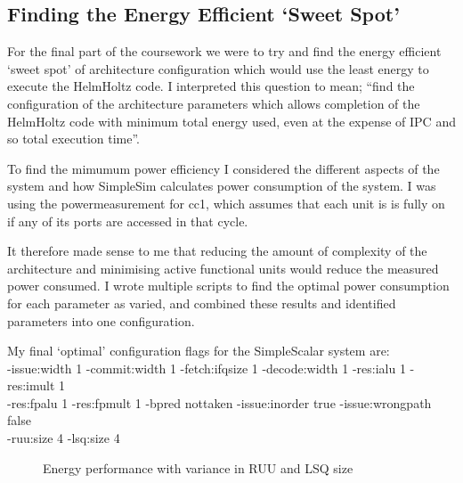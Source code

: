\documentclass[paper=a4, fontsize=11pt]{scrartcl} %
\numberwithin{equation}{section} %
\numberwithin{figure}{section} %
\numberwithin{table}{section} %
\begin{document}
\subsection{Finding the Energy Efficient `Sweet Spot'}

For the final part of the coursework we were to try and find the energy efficient `sweet spot' of architecture configuration which would use the least energy to execute the HelmHoltz code.  I interpreted this question to mean; ``find the configuration of the architecture parameters which allows completion of the HelmHoltz code with minimum total energy used, even at the expense of IPC and so total execution time''.

To find the mimumum power efficiency I considered the different aspects of the system and how SimpleSim calculates power consumption of the system.  I was using the powermeasurement for cc1, which assumes that each unit is is fully on if any of its ports are accessed in that cycle.

It therefore made sense to me that reducing the amount of complexity of the architecture and minimising active functional units would reduce the measured power consumed.  I wrote multiple scripts to find the optimal power consumption for each parameter as varied, and combined these  results and identified parameters into one configuration.

My final `optimal' configuration flags for the SimpleScalar system are: \\
-issue:width 1 -commit:width 1 -fetch:ifqsize 1 -decode:width 1 -res:ialu 1 -res:imult 1 \\ -res:fpalu 1 -res:fpmult 1 -bpred nottaken -issue:inorder true -issue:wrongpath false \\ -ruu:size 4 -lsq:size 4

\begin{figure}
\centering
 \caption{Energy performance with variance in RUU and LSQ size}
\end{figure}
\end{document}
